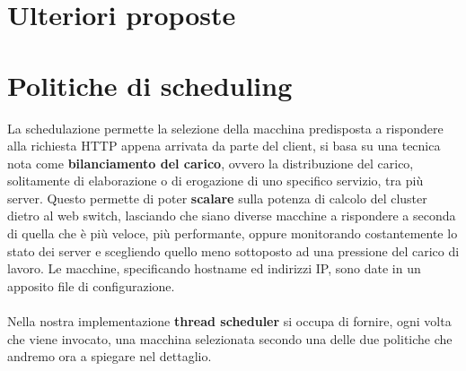 \documentclass[italian]{tktltiki2}
\begin{document}
\section{Ulteriori proposte}

\newpage
\section{Politiche di scheduling}
 \label{sec: sched_p}
La schedulazione permette la selezione della macchina predisposta a rispondere alla richiesta HTTP appena arrivata da parte del client, si basa su una tecnica nota come \textbf{bilanciamento del carico}, ovvero la distribuzione del carico, solitamente di elaborazione o di erogazione di uno specifico servizio, tra più server. Questo permette di poter \textbf{scalare} sulla potenza di calcolo del cluster dietro al web switch, lasciando che siano diverse macchine a rispondere a seconda di quella che è più veloce, più performante, oppure monitorando costantemente lo stato dei server e scegliendo quello meno sottoposto ad una pressione del carico di lavoro. Le macchine, specificando hostname ed indirizzi IP, sono date in un apposito file di configurazione.
\\
\\
Nella nostra implementazione \textbf{thread scheduler} si occupa di fornire,  ogni volta che viene invocato, una macchina selezionata secondo una delle due politiche che andremo ora a spiegare nel dettaglio.
\end{document}
